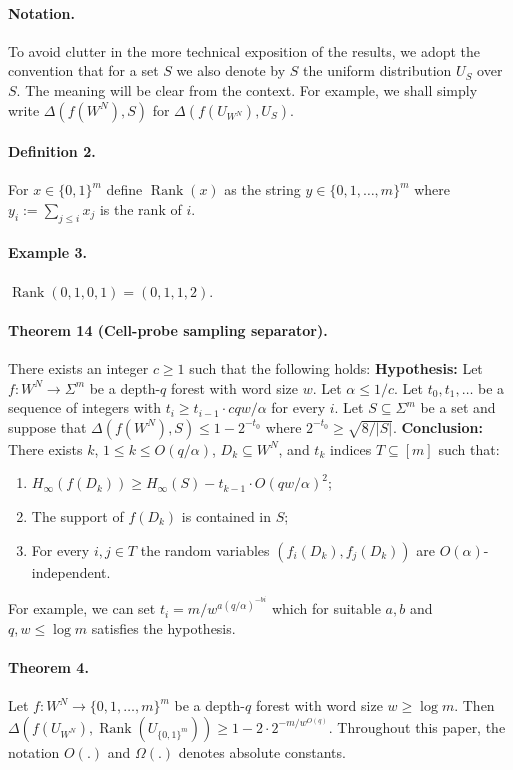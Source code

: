 \documentclass[10pt,a4paper]{article}
\begin{document}
\paragraph{Notation.}
To avoid clutter in the more technical exposition of the results, we adopt the convention that for a set $S$ we also denote by $S$ the uniform distribution $U_S$ over $S$. The meaning will be clear from the context. For example, we shall simply write $\Delta(f(W^N),S)$ for $\Delta(f(U_{W^N}),U_S)$.

\paragraph{Definition 2.}
For $x\in\{0,1\}^m$ define $\operatorname{Rank}(x)$ as the string $y\in\{0,1,\ldots,m\}^m$ where $y_i:=\sum_{j\leq i}x_j$ is the rank of $i$.
\paragraph{Example 3.}
$\operatorname{Rank}(0,1,0,1)=(0,1,1,2)$.

\paragraph{Theorem 14 (Cell-probe sampling separator).}
There exists an integer $c\geq1$ such that the following holds:
\textbf{Hypothesis:} Let $f:W^N\to\Sigma^m$ be a depth-$q$ forest with word size $w$. Let $\alpha\leq1/c$. Let $t_0,t_1,\ldots$ be a sequence of integers with $t_i\geq t_{i-1}\cdot cqw/\alpha$ for every $i$. Let $S\subseteq\Sigma^m$ be a set and suppose that $\Delta(f(W^N),S)\leq1-2^{-t_0}$ where $2^{-t_0}\geq\sqrt{8/|S|}$.
\textbf{Conclusion:} There exists $k$, $1\leq k\leq O(q/\alpha)$, $D_k\subseteq W^N$, and $t_k$ indices $T\subseteq[m]$ such that:
\begin{enumerate}
\item[(0)] $H_\infty(f(D_k))\geq H_\infty(S)-t_{k-1}\cdot O(qw/\alpha)^2$;
\item[(1)] The support of $f(D_k)$ is contained in $S$;
\item[(2)] For every $i,j\in T$ the random variables $(f_i(D_k),f_j(D_k))$ are $O(\alpha)$-independent.
\end{enumerate}
For example, we can set $t_i=m/w^{a(q/\alpha)^{-bi}}$ which for suitable $a,b$ and $q,w\leq\log m$ satisfies the hypothesis.

\paragraph{Theorem 4.}
Let $f:W^N\to\{0,1,\ldots,m\}^m$ be a depth-$q$ forest with word size $w\geq\log m$. Then $\Delta(f(U_{W^N}),\operatorname{Rank}(U_{\{0,1\}^m}))\geq1-2\cdot2^{-m/w^{O(q)}}$.
Throughout this paper, the notation $O(.)$ and $\Omega(.)$ denotes absolute constants.
\end{document}
